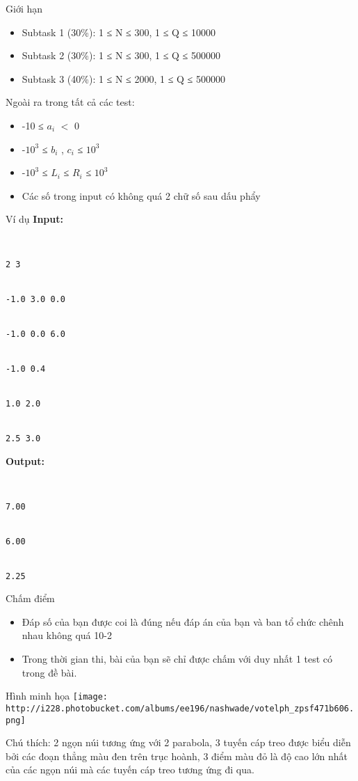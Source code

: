 Giới hạn  
\begin{itemize}
	\item     Subtask 1 (30\%): 1 ≤ N ≤ 300, 1 ≤ Q ≤ 10000   
	\item     Subtask 2 (30\%): 1 ≤ N ≤ 300, 1 ≤ Q ≤ 500000   
	\item     Subtask 3 (40\%): 1 ≤ N ≤ 2000, 1 ≤ Q ≤ 500000   
\end{itemize}

   Ngoài ra trong tất cả các test:  
\begin{itemize}
	\item     -10 ≤ $a_{i}$    $<$ 0   
	\item     -$10^{3}$    ≤ $b_{i}$    , $c_{i}$    ≤ $10^{3}$
	\item     -$10^{3}$    ≤ $L_{i}$    ≤ $R_{i}$    ≤ $10^{3}$
	\item     Các số trong input có không quá 2 chữ số sau dấu phẩy   
\end{itemize}
   Ví dụ  
\textbf{    Input:   }
\begin{verbatim}


2 3


-1.0 3.0 0.0


-1.0 0.0 6.0


-1.0 0.4


1.0 2.0


2.5 3.0\end{verbatim}

\textbf{    Output:   }
\begin{verbatim}


7.00


6.00


2.25\end{verbatim}
   Chấm điểm  
\begin{itemize}
	\item     Đáp số của bạn được coi là đúng nếu đáp án của bạn và ban tổ chức chênh nhau không quá 10-2   
	\item     Trong thời gian thi, bài của bạn sẽ chỉ được chấm với duy nhất 1 test có trong đề bài.   
\end{itemize}
   Hình minh họa  
\texttt{[image: http://i228.photobucket.com/albums/ee196/nashwade/votelph\_zpsf471b606.png]}

Chú thích: 2 ngọn núi tương ứng với 2 parabola, 3 tuyến cáp treo được biểu diễn bởi các đoạn thẳng màu đen trên trục hoành, 3 điểm màu đỏ là độ cao lớn nhất của các ngọn núi mà các tuyến cáp treo tương ứng đi qua.